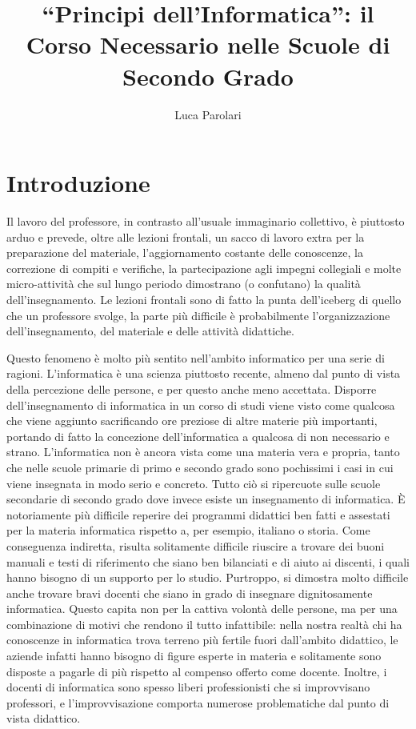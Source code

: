 \documentclass[11pt,a4paper]{article}
\author{Luca Parolari}
\title{``Principi dell'Informatica'': il Corso Necessario nelle Scuole di Secondo Grado}
\begin{document}
\maketitle

\section{Introduzione}

Il lavoro del professore, in contrasto all'usuale immaginario
collettivo, è piuttosto arduo e prevede, oltre alle lezioni frontali,
un sacco di lavoro extra per la preparazione del materiale,
l'aggiornamento costante delle conoscenze, la correzione di compiti e
verifiche, la partecipazione agli impegni collegiali e molte
micro-attività che sul lungo periodo dimostrano (o confutano) la
qualità dell'insegnamento. Le lezioni frontali sono di fatto la punta
dell'iceberg di quello che un professore svolge, la parte più
difficile è probabilmente l'organizzazione dell'insegnamento, del
materiale e delle attività didattiche.

Questo fenomeno è molto più sentito nell'ambito informatico per una
serie di ragioni. L'informatica è una scienza piuttosto recente,
almeno dal punto di vista della percezione delle persone, e per questo
anche meno accettata. Disporre dell'insegnamento di informatica in un
corso di studi viene visto come qualcosa che viene aggiunto
sacrificando ore preziose di altre materie più importanti, portando di
fatto la concezione dell'informatica a qualcosa di non necessario e
strano.  L'informatica non è ancora vista come una materia vera e
propria, tanto che nelle scuole primarie di primo e secondo grado sono
pochissimi i casi in cui viene insegnata in modo serio e concreto.
Tutto ciò si ripercuote sulle scuole secondarie di secondo grado dove
invece esiste un insegnamento di informatica. \`E notoriamente più
difficile reperire dei programmi didattici ben fatti e assestati per
la materia informatica rispetto a, per esempio, italiano o
storia. Come conseguenza indiretta, risulta solitamente difficile
riuscire a trovare dei buoni manuali e testi di riferimento che siano
ben bilanciati e di aiuto ai discenti, i quali hanno bisogno di un
supporto per lo studio. Purtroppo, si dimostra molto difficile anche
trovare bravi docenti che siano in grado di insegnare dignitosamente
informatica. Questo capita non per la cattiva volontà delle persone,
ma per una combinazione di motivi che rendono il tutto infattibile:
nella nostra realtà chi ha conoscenze in informatica trova terreno più
fertile fuori dall'ambito didattico, le aziende infatti hanno bisogno
di figure esperte in materia e solitamente sono disposte a pagarle di
più rispetto al compenso offerto come docente. Inoltre, i docenti di
informatica sono spesso liberi professionisti che si improvvisano
professori, e l'improvvisazione comporta numerose problematiche dal
punto di vista didattico.
\end{document}
